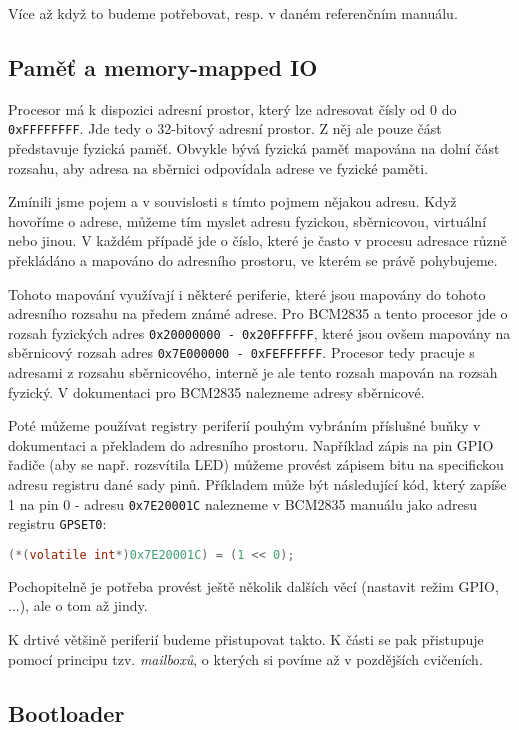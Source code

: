 \documentclass{article}
\begin{document}
Více až když to budeme potřebovat, resp. v daném referenčním manuálu.

\subsection{Paměť a memory-mapped IO}

Procesor má k dispozici adresní prostor, který lze adresovat čísly od 0 do \texttt{0xFFFFFFFF}. Jde tedy o 32-bitový adresní prostor. Z něj ale pouze část představuje fyzická paměť. Obvykle bývá fyzická paměť mapována na dolní část rozsahu, aby adresa na sběrnici odpovídala adrese ve fyzické paměti.

Zmínili jsme pojem  a v souvislosti s tímto pojmem nějakou adresu. Když hovoříme o adrese, můžeme tím myslet adresu fyzickou, sběrnicovou, virtuální nebo jinou. V každém případě jde o číslo, které je často v procesu adresace různě překládáno a mapováno do adresního prostoru, ve kterém se právě pohybujeme.

Tohoto mapování využívají i některé periferie, které jsou mapovány do tohoto adresního rozsahu na předem známé adrese. Pro BCM2835 a tento procesor jde o rozsah fyzických adres \texttt{0x20000000 - 0x20FFFFFF}, které jsou ovšem mapovány na sběrnicový rozsah adres \texttt{0x7E000000 - 0xFEFFFFFF}. Procesor tedy pracuje s adresami z rozsahu sběrnicového, interně je ale tento rozsah mapován na rozsah fyzický. V dokumentaci pro BCM2835 nalezneme adresy sběrnicové.

Poté můžeme používat registry periferií pouhým vybráním příslušné buňky v dokumentaci a překladem do adresního prostoru. Například zápis na pin GPIO řadiče (aby se např. rozsvítila LED) můžeme provést zápisem bitu na specifickou adresu  registru dané sady pinů. Příkladem může být následující kód, který zapíše 1 na pin 0 - adresu \texttt{0x7E20001C} nalezneme v BCM2835 manuálu jako adresu registru \texttt{GPSET0}:

\begin{lstlisting}[language=C]
(*(volatile int*)0x7E20001C) = (1 << 0);
\end{lstlisting}

Pochopitelně je potřeba provést ještě několik dalších věcí (nastavit režim GPIO, ...), ale o tom až jindy.

K drtivé většině periferií budeme přistupovat takto. K části se pak přistupuje pomocí principu tzv. \emph{mailboxů}, o kterých si povíme až v pozdějších cvičeních.

\subsection{Bootloader}
\end{document}
